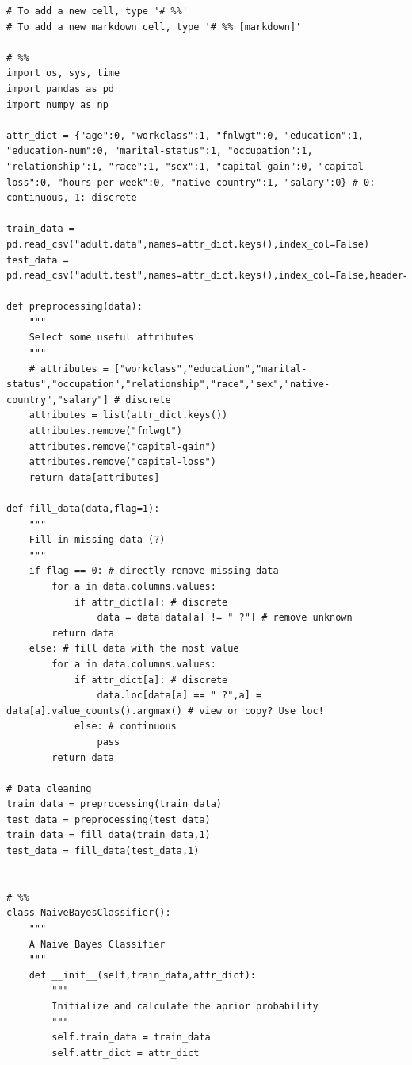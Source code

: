 \documentclass[a4paper, 11pt]{article}
\begin{document}
\begin{lstlisting}
# To add a new cell, type '# %%'
# To add a new markdown cell, type '# %% [markdown]'

# %%
import os, sys, time
import pandas as pd
import numpy as np

attr_dict = {"age":0, "workclass":1, "fnlwgt":0, "education":1, "education-num":0, "marital-status":1, "occupation":1, "relationship":1, "race":1, "sex":1, "capital-gain":0, "capital-loss":0, "hours-per-week":0, "native-country":1, "salary":0} # 0: continuous, 1: discrete

train_data = pd.read_csv("adult.data",names=attr_dict.keys(),index_col=False)
test_data = pd.read_csv("adult.test",names=attr_dict.keys(),index_col=False,header=0)

def preprocessing(data):
    """
    Select some useful attributes
    """
    # attributes = ["workclass","education","marital-status","occupation","relationship","race","sex","native-country","salary"] # discrete
    attributes = list(attr_dict.keys())
    attributes.remove("fnlwgt")
    attributes.remove("capital-gain")
    attributes.remove("capital-loss")
    return data[attributes]

def fill_data(data,flag=1):
    """
    Fill in missing data (?)
    """
    if flag == 0: # directly remove missing data
        for a in data.columns.values:
            if attr_dict[a]: # discrete
                data = data[data[a] != " ?"] # remove unknown
        return data
    else: # fill data with the most value
        for a in data.columns.values:
            if attr_dict[a]: # discrete
                data.loc[data[a] == " ?",a] = data[a].value_counts().argmax() # view or copy? Use loc!
            else: # continuous
                pass
        return data

# Data cleaning
train_data = preprocessing(train_data)
test_data = preprocessing(test_data)
train_data = fill_data(train_data,1)
test_data = fill_data(test_data,1)


# %%
class NaiveBayesClassifier():
    """
    A Naive Bayes Classifier
    """
    def __init__(self,train_data,attr_dict):
        """
        Initialize and calculate the aprior probability
        """
        self.train_data = train_data
        self.attr_dict = attr_dict


\end{lstlisting}
\end{document}
